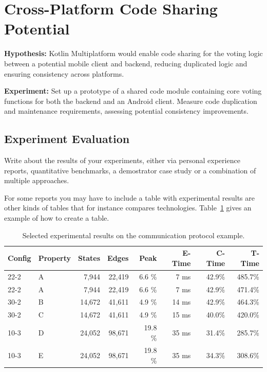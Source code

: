\section*{Cross-Platform Code Sharing Potential}

\textbf{Hypothesis:} Kotlin Multiplatform would enable code sharing for the voting logic between a potential mobile client and backend, reducing duplicated logic and ensuring consistency across platforms.

\textbf{Experiment:} Set up a prototype of a shared code module containing core voting functions for both the backend and an Android client. Measure code duplication and maintenance requirements, assessing potential consistency improvements.


\subsection{Experiment Evaluation}

Write about the results of your experiments, either via personal experience reports, quantitative benchmarks, a demostrator case study or a combination of multiple approaches.


For some reports you may have to include a table with experimental
results are other kinds of tables that for instance compares
technologies. Table~\ref{tab:results} gives an example of how to create a table.

\begin{table}[bth]
	\centering
	\begin{tabular}{llrrrrrr}
		Config & Property & States & Edges & Peak & E-Time & C-Time & T-Time
		\\ \hline \hline
		22-2 & A   &    7,944  &   22,419  &  6.6  \%  &  7 ms & 42.9\% &  485.7\% \\
		22-2 & A   &    7,944  &   22,419  &  6.6  \%  &  7 ms & 42.9\% &  471.4\% \\
		30-2 & B   &   14,672  &   41,611  &  4.9  \%  & 14 ms & 42.9\% &  464.3\% \\
		30-2 & C   &   14,672  &   41,611  &  4.9  \%  & 15 ms & 40.0\% &  420.0\% \\ \hline
		10-3 & D   &   24,052  &   98,671  & 19.8  \%  & 35 ms & 31.4\% &  285.7\% \\
		10-3 & E   &   24,052  &   98,671  & 19.8  \%  & 35 ms & 34.3\% &  308.6\% \\
		\hline \hline
	\end{tabular}
	\caption{Selected experimental results on the communication protocol example.}
	\label{tab:results}
\end{table}


